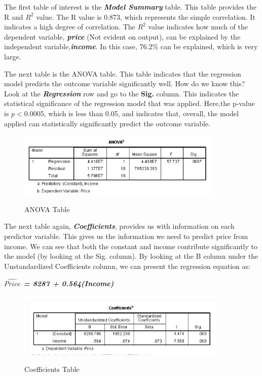 \documentclass[a4paper,12pt]{article}
\begin{document}
The first table of interest is the \textbf{\textit{Model Summary}} table. This table provides the R and $R^2$ value. The R value is 0.873, which represents the simple correlation. It indicates a high degree of correlation. The $R^2$ value indicates how much of the dependent variable, \textbf{\textit{price}} (Not evident on output), can be explained by the independent variable,\textbf{\textit{income}}. In this case, 76.2\% can be explained, which is very large.


The next table is the ANOVA table. This table indicates that the regression model predicts the outcome variable significantly well. How do we know this? Look at the \textbf{\textit{Regression}} row and go to the \textbf{Sig.} column. This indicates the statistical significance of the regression model that was applied. Here,the p-value is  $p < 0.0005$, which is less than 0.05, and indicates that, overall, the model applied can statistically significantly predict the outcome variable.

\begin{figure}[h!]
\begin{centering}
  \includegraphics[width=10cm]{Regre5.jpg}\\
  \caption{ANOVA Table}
\end{centering}
\end{figure}

The next table again, \textbf{\textit{Coefficients}}, provides us with information on each predictor variable. This gives us the information we need to predict price from income. We can see that both the constant and income contribute significantly to the model (by looking at the Sig. column). By looking at the B column under the Unstandardized Coefficients column, we can present the regression equation as:

\textit{\textbf{ $\hat{Price}$ = 8287 + 0.564(Income)}}

\begin{figure}[h!]
\begin{centering}
  \includegraphics[width=10cm]{Regre6.jpg}\\
  \caption{Coefficients Table}
\end{centering}
\end{figure}
\end{document}
